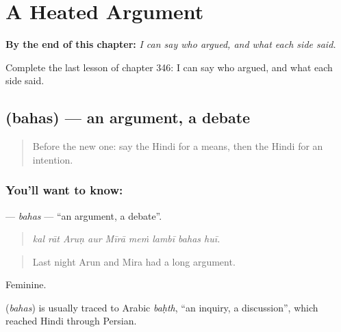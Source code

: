 
\chapter{A Heated Argument}
\label{ch:hi-a-heated-argument}

\begin{chapteropening}
\textbf{By the end of this chapter:} \emph{I can say who argued, and what each side said.}

Complete the last lesson of chapter 346: I can say who argued, and what each side said.
\end{chapteropening}

\section[\texorpdfstring{\hi{बहस} (bahas)}{बहस (bahas)}]{ (bahas) — an argument, a debate}

\label{lesson:HI-C346-bahas}



\begin{quote}
Before the new one: say the Hindi for a means, then the Hindi for an intention.
\end{quote}

\subsection*{You'll want to know: }
\textbf{} — \emph{bahas} — \textquotedblleft{}an argument, a debate\textquotedblright{}.

\begin{quote}
        
\end{quote}

\begin{quote}
\emph{kal rāt Aruṇ aur Mīrā meṁ lambī bahas huī.}
\end{quote}

\begin{quote}
Last night Arun and Mira had a long argument.
\end{quote}

Feminine.

\begin{cousinweb}
\textbf{} (\emph{bahas}) is usually traced to Arabic \emph{baḥth}, \textquotedblleft{}an inquiry, a discussion\textquotedblright{}, which reached Hindi through Persian.
\end{cousinweb}

